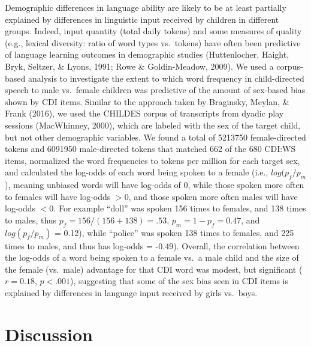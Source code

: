 \documentclass[10pt, letterpaper]{article}
\begin{document}
Demographic differences in language ability are likely to be at least
partially explained by differences in linguistic input received by
children in different groups. Indeed, input quantity (total daily
tokens) and some measures of quality (e.g., lexical diversity: ratio of
word types vs.~tokens) have often been predictive of language learning
outcomes in demographic studies (Huttenlocher, Haight, Bryk, Seltzer, \&
Lyons, 1991; Rowe \& Goldin-Meadow, 2009). We used a corpus-based
analysis to investigate the extent to which word frequency in
child-directed speech to male vs.~female children was predictive of the
amount of sex-based bias shown by CDI items. Similar to the approach
taken by Braginsky, Meylan, \& Frank (2016), we used the CHILDES corpus
of transcripts from dyadic play sessions (MacWhinney, 2000), which are
labeled with the sex of the target child, but not other demographic
variables. We found a total of 5213750 female-directed tokens and
6091950 male-directed tokens that matched 662 of the 680 CDI:WS items,
normalized the word frequencies to tokens per million for each target
sex, and calculated the log-odds of each word being spoken to a female
(i.e., \(log(p_{f} / p_{m}\)), meaning unbiased words will have log-odds
of 0, while those spoken more often to females will have log-odds
\(>0\), and those spoken more often males will have log-odds \(<0\). For
example ``doll'' was spoken 156 times to females, and 138 times to
males, thus \(p_{f} = 156/(156+138) = .53\), \(p_{m} = 1-p_{f} = 0.47\),
and \(log(p_{f}/p_{m})\) = 0.12), while ``police'' was spoken 138 times
to females, and 225 times to males, and thus has log-odds = -0.49).
Overall, the correlation between the log-odds of a word being spoken to
a female vs.~a male child and the size of the female (vs.~male)
advantage for that CDI word was modest, but significant (\(r=0.18\),
\(p<.001\)), suggesting that some of the sex bias seen in CDI items is
explained by differences in language input received by girls vs.~boys.

\hypertarget{discussion}{%
\section{Discussion}\label{discussion}}
\end{document}

